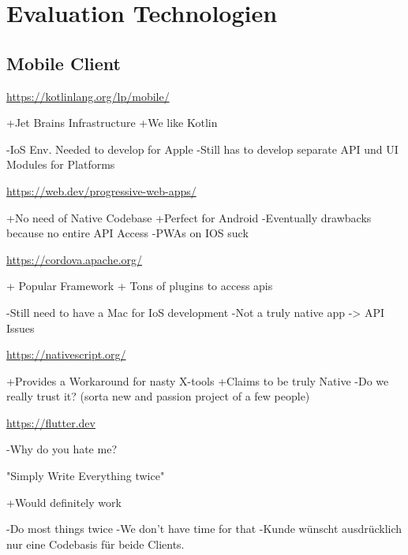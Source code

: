 \section{Evaluation Technologien}

\subsection{Mobile Client}



\url{https://kotlinlang.org/lp/mobile/}
	

    +Jet Brains Infrastructure 
    +We like Kotlin 

    -IoS Env. Needed to develop for Apple 
    -Still has to develop separate API und UI Modules for Platforms 

\url{https://web.dev/progressive-web-apps/ }
	
    +No need of Native Codebase
    +Perfect for Android 
    -Eventually drawbacks because no entire API Access 
    -PWAs on IOS suck

\url{https://cordova.apache.org/} 
	

    + Popular Framework 
    + Tons of plugins to access apis 

    -Still need to have a Mac for IoS development  
    -Not a truly native app -> API Issues
 

\url{https://nativescript.org/ }

    +Provides a Workaround for nasty X-tools 
    +Claims to be truly Native 
    -Do we really trust it? (sorta new and passion project of a few people) 

 
 \url{https://flutter.dev}

    -Why do you hate me?


"Simply Write Everything twice"

    +Would definitely work

    -Do most things twice
    -We don't have time for that
    -Kunde wünscht ausdrücklich nur eine Codebasis für beide Clients.
	

  

